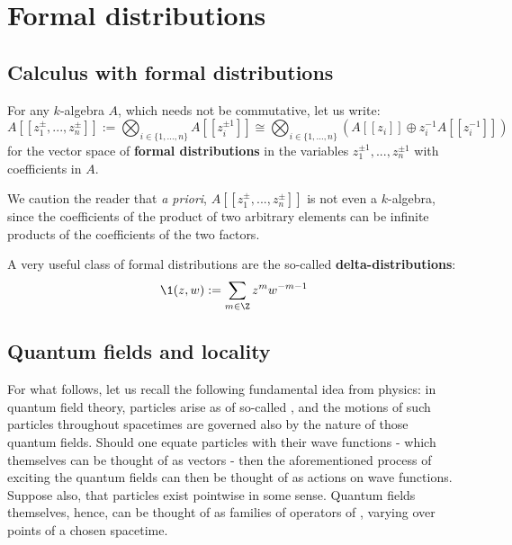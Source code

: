 \section{Formal distributions}
    \subsection{Calculus with formal distributions}
        \begin{definition} \label{def: formal_distributions}
            For any $k$-algebra $A$, which needs not be commutative, let us write:
                $$A[\![z_1^{\pm}, ..., z_n^{\pm}]\!] := \bigotimes_{i \in \{1, ..., n\}} A[\![z_i^{\pm 1}]\!] \cong \bigotimes_{i \in \{1, ..., n\}} ( A[\![z_i]\!] \oplus z_i^{-1} A[\![z_i^{-1}]\!] )$$
            for the vector space of \textbf{formal distributions} in the variables $z_1^{\pm 1}, ..., z_n^{\pm 1}$ with coefficients in $A$.
        \end{definition}
        \begin{remark}
            We caution the reader that \textit{a priori}, $A[\![z_1^{\pm}, ..., z_n^{\pm}]\!]$ is not even a $k$-algebra, since the coefficients of the product of two arbitrary elements can be infinite products of the coefficients of the two factors.  
        \end{remark}
        \begin{example} \label{example: delta_distributions}
            A very useful class of formal distributions are the so-called \textbf{delta-distributions}:
                $$\1(z, w) := \sum_{m \in \Z} z^m w^{-m - 1}$$
            \end{example}


    \subsection{Quantum fields and locality}
        For what follows, let us recall the following fundamental idea from physics: in quantum field theory, particles arise as  of so-called , and the motions of such particles throughout spacetimes are governed also by the nature of those quantum fields. Should one equate particles with their wave functions - which themselves can be thought of as vectors - then the aforementioned process of exciting the quantum fields can then be thought of as actions on wave functions. Suppose also, that particles exist pointwise in some sense. Quantum fields themselves, hence, can be thought of as families of operators of , varying over points of a chosen spacetime.

